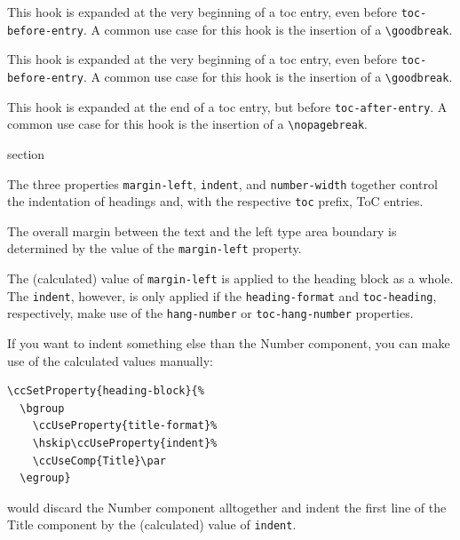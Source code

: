 
This hook is expanded at the very beginning of a toc entry, even
before \lstinline{toc-before-entry}.  A common use case for this hook
is the insertion of a \lstinline{\goodbreak}.


This hook is expanded at the very beginning of a toc entry, even
before \lstinline{toc-before-entry}.  A common use case for this hook
is the insertion of a \lstinline{\goodbreak}.


This hook is expanded at the end of a toc entry, but before
\lstinline{toc-after-entry}. A common use case for this hook is the
insertion of a \lstinline{\nopagebreak}.



\begin{Heading}[label=sec:hdg:indent]{section}
\end{Heading}

The three properties \lstinline{margin-left}, \lstinline{indent}, and
\lstinline{number-width} together control the indentation of headings
and, with the respective \lstinline{toc} prefix, ToC entries.

The overall margin between the text and the left type area boundary is
determined by the value of the \lstinline{margin-left} property.

The (calculated) value of \lstinline{margin-left} is applied to the
heading block as a whole. The \lstinline{indent}, however, is only
applied if the \lstinline{heading-format} and \lstinline{toc-heading},
respectively, make use of the \lstinline{hang-number} or
\lstinline{toc-hang-number} properties.

If you want to indent something else than the Number component, you
can make use of the calculated values manually:
\begin{lstlisting}
\ccSetProperty{heading-block}{%
  \bgroup
    \ccUseProperty{title-format}%
    \hskip\ccUseProperty{indent}%
    \ccUseComp{Title}\par
  \egroup}
\end{lstlisting}
would discard the Number component alltogether and indent the first
line of the Title component by the (calculated) value of
\lstinline{indent}.

